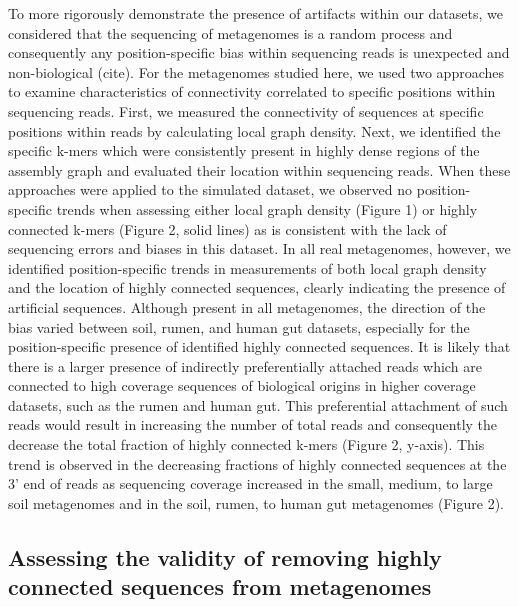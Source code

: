 \documentclass[10pt]{article}
\begin{document}
To more rigorously demonstrate the presence of artifacts within our
datasets, we considered that the sequencing of metagenomes is a random
process and consequently any position-specific bias within sequencing
reads is unexpected and non-biological (cite).  For the metagenomes
studied here, we used two approaches to examine characteristics of
connectivity correlated to specific positions within sequencing reads.
First, we measured the connectivity of sequences at specific positions
within reads by calculating local graph density.  Next, we identified
the specific k-mers which were consistently present in highly dense
regions of the assembly graph and evaluated their location within
sequencing reads.  When these approaches were applied to the simulated
dataset, we observed no position-specific trends when assessing either
local graph density (Figure 1) or highly connected k-mers (Figure 2,
solid lines) as is consistent with the lack of sequencing errors and
biases in this dataset.  In all real metagenomes, however, we
identified position-specific trends in measurements of both local
graph density and the location of highly connected sequences, clearly
indicating the presence of artificial sequences.  Although present in
all metagenomes, the direction of the bias varied between soil, rumen,
and human gut datasets, especially for the position-specific presence
of identified highly connected sequences.  It is likely that there is
a larger presence of indirectly preferentially attached reads which
are connected to high coverage sequences of biological origins in
higher coverage datasets, such as the rumen and human gut.  This
preferential attachment of such reads would result in increasing the
number of total reads and consequently the decrease the total fraction
of highly connected k-mers (Figure 2, y-axis).  This trend is observed
in the decreasing fractions of highly connected sequences at the 3'
end of reads as sequencing coverage increased in the small, medium, to
large soil metagenomes and in the soil, rumen, to human gut
metagenomes (Figure 2).

\subsection*{Assessing the validity of removing highly connected sequences from metagenomes}
\end{document}
